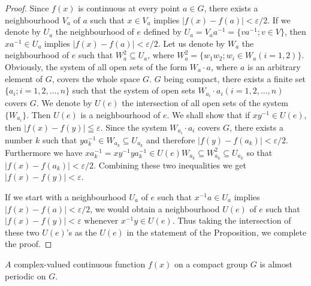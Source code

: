 \begin{proof}
 Since $f(x)$ is continuous at every point $a \in G$, there exists a neighbourhood $V_{a}$ of $a$ such that $x \in V_{a}$ implies $|f(x) - f(a)| < \varepsilon / 2$. If we denote by $U_{a}$ the neighbourhood of $e$ defined by $U_{a} = V_{a}a^{-1} = \{va^{-1}; v \in V\}$, then $xa^{-1} \in U_{a}$ implies $|f(x) - f(a)| < \varepsilon / 2$. Let us denote by $W_{a}$ the neighbourhood of $e$ such that $W_{a}^{2} \subseteq U_{a}$, where $W_{a}^{2} = \{w_{1}w_{2}; w_{i} \in W_{a}(i = 1,2)\}$. Obviously, the system of all open sets of the form $W_{a} \cdot a$, where $a$ is an arbitrary element of $G$, covers the whole space $G$. $G$ being compact, there exists a finite set $\{a_{i}; i = 1,2,\ldots,n\}$ such that the system of open sets $W_{a_{i}} \cdot a_{i} (i = 1,2,\ldots,n)$ covers $G$. We denote by $U(e)$ the intersection of all open sets of the system $\{W_{a_{i}}\}$. Then $U(e)$ is a neighbourhood of $e$. We shall show that if $xy^{-1} \in U(e)$, then $|f(x) - f(y)| \leqq \varepsilon$. Since the system $W_{a_{i}} \cdot a_{i}$ covers $G$, there exists a number $k$ such that $ya_{k}^{-1} \in W_{a_{k}} \subseteq U_{a_{k}}$ and therefore $|f(y) - f(a_{k})| < \varepsilon / 2$. Furthermore we have $xa_{k}^{-1} = xy^{-1}ya_{k}^{-1} \in U(e) W_{a_{k}} \subseteq W_{a_{k}}^{2} \subseteq U_{a_{k}}$ so that $|f(x) - f(a_{k})| < \varepsilon / 2$. Combining these two inequalities we get $|f(x) - f(y)| < \varepsilon$. 

If we start with a neighbourhood $U_{a}$ of $e$ such that $x^{-1}a \in U_{a}$ implies $|f(x) - f(a)| < \varepsilon / 2$, we would obtain a neighbourhood $U(e)$ of $e$ such that $|f(x) - f(y)| < \varepsilon$ whenever $x^{-1}y \in U(e)$. Thus taking the intersection of these two $U(e)$'s as the $U(e)$ in the statement of the Proposition, we complete the proof. 
\end{proof}

\begin{corollaryu} $A$ complex-valued continuous function $f(x)$ on a compact group $G$ is almost periodic on $G$. 
\end{corollaryu}

